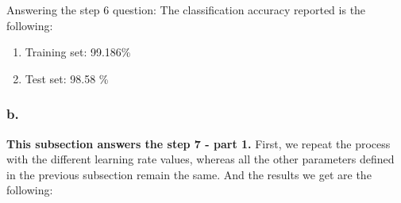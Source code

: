 \documentclass[a4paper]{iacas}
\begin{document}
Answering the step 6 question:
The classification accuracy reported is the following:
\begin{enumerate}
\item Training set: 99.186\%
\item Test set: 98.58 \%
\end{enumerate}

\newpage
\subsubsection{\textbf{b.}}
\textbf{This subsection answers the step 7 - part 1. }
\newline
First, we repeat the process with the different learning rate values, whereas all the other parameters defined in the previous subsection remain the same. And the results we get are the following:
\end{document}
